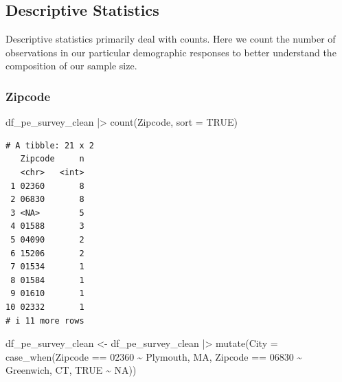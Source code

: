 \documentclass[
  letterpaper,
  DIV=11,
  numbers=noendperiod]{scrartcl}
\newenvironment{Shaded}{\begin{snugshade}}{\end{snugshade}}
\newcommand{\AttributeTok}[1]{\textcolor[rgb]{0.40,0.45,0.13}{#1}}
\newcommand{\ConstantTok}[1]{\textcolor[rgb]{0.56,0.35,0.01}{#1}}
\newcommand{\FunctionTok}[1]{\textcolor[rgb]{0.28,0.35,0.67}{#1}}
\newcommand{\NormalTok}[1]{\textcolor[rgb]{0.00,0.23,0.31}{#1}}
\newcommand{\OtherTok}[1]{\textcolor[rgb]{0.00,0.23,0.31}{#1}}
\newcommand{\SpecialCharTok}[1]{\textcolor[rgb]{0.37,0.37,0.37}{#1}}
\newcommand{\StringTok}[1]{\textcolor[rgb]{0.13,0.47,0.30}{#1}}
\begin{document}
\hypertarget{descriptive-statistics}{%
\subsection{Descriptive Statistics}\label{descriptive-statistics}}

Descriptive statistics primarily deal with counts. Here we count the
number of observations in our particular demographic responses to better
understand the composition of our sample size.

\hypertarget{zipcode}{%
\subsubsection{Zipcode}\label{zipcode}}

\begin{Shaded}
\begin{Highlighting}[]
\NormalTok{df\_pe\_survey\_clean }\SpecialCharTok{|\textgreater{}} 
  \FunctionTok{count}\NormalTok{(Zipcode, }\AttributeTok{sort =} \ConstantTok{TRUE}\NormalTok{)}
\end{Highlighting}
\end{Shaded}

\begin{verbatim}
# A tibble: 21 x 2
   Zipcode     n
   <chr>   <int>
 1 02360       8
 2 06830       8
 3 <NA>        5
 4 01588       3
 5 04090       2
 6 15206       2
 7 01534       1
 8 01584       1
 9 01610       1
10 02332       1
# i 11 more rows
\end{verbatim}

\begin{Shaded}
\begin{Highlighting}[]
\NormalTok{df\_pe\_survey\_clean }\OtherTok{\textless{}{-}}
\NormalTok{  df\_pe\_survey\_clean }\SpecialCharTok{|\textgreater{}} 
  \FunctionTok{mutate}\NormalTok{(}\AttributeTok{City =} \FunctionTok{case\_when}\NormalTok{(Zipcode }\SpecialCharTok{==} \StringTok{\textquotesingle{}02360\textquotesingle{}} \SpecialCharTok{\textasciitilde{}} \StringTok{\textquotesingle{}Plymouth, MA\textquotesingle{}}\NormalTok{,}
\NormalTok{                          Zipcode }\SpecialCharTok{==} \StringTok{\textquotesingle{}06830\textquotesingle{}} \SpecialCharTok{\textasciitilde{}} \StringTok{\textquotesingle{}Greenwich, CT\textquotesingle{}}\NormalTok{,}
                          \ConstantTok{TRUE} \SpecialCharTok{\textasciitilde{}} \ConstantTok{NA}\NormalTok{))}
\end{Highlighting}
\end{Shaded}
\end{document}
